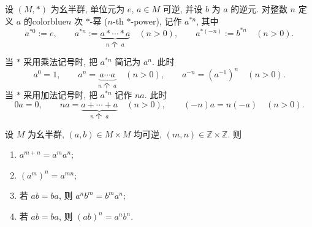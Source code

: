 \documentclass[usesamecnt, thmcnt=section, lang=cn, newtx, 10pt, scheme=chinese]{elegantbook}
\begin{document}
\begin{definition}[可逆元的整数次运算]\label{def:alg-integer-power}
设 $(M,*)$ 为幺半群, 单位元为 $e$, $a\in M$ 可逆, 并设 $b$ 为 $a$ 的逆元. 对整数 $n$ 定义 $a$ 的{color{blue}$n$ 次 $*$-幂 ($n$-th $*$-power)}, 记作 $a^{*n}$, 其中
\[
 a^{*0}:=e,
 \qquad
 a^{*n}:=\underbrace{a*\cdots*a}_{n\text{ 个 }\;a}\quad(n>0),
 \qquad
 a^{*(-n)}:=b^{*n}\quad(n>0).
\]

当 $*$ 采用乘法记号时, 把 $a^{*n}$ 简记为 $a^n$. 此时
\[
 a^0=1,
 \qquad
 a^n=\underbrace{a\cdots a}_{n\text{ 个 }\;a}\quad(n>0),
 \qquad
 a^{-n}=(a^{-1})^n\quad(n>0).
\]
当 $*$ 采用加法记号时, 把 $a^{*n}$ 记作 $na$. 此时
\[
 0a=0,
 \qquad
 na=\underbrace{a+\cdots+a}_{n\text{ 个 }\;a}\quad(n>0),
 \qquad
 (-n)a=n(-a)\quad(n>0).
\]
\end{definition}

\begin{proposition}\label{prop:alg-power-laws}
设 $M$ 为幺半群, $(a,b)\in M\times M$ 均可逆, $(m,n)\in\mathbb Z\times\mathbb Z$. 则
\begin{enumerate}[label=\rm(\arabic*)]
  \item $a^{m+n}=a^ma^n$;
  \item $(a^m)^n=a^{mn}$;
  \item 若 $ab=ba$, 则 $a^nb^m=b^ma^n$;
  \item 若 $ab=ba$, 则 $(ab)^n=a^nb^n$.
\end{enumerate}
\end{proposition}
\end{document}
